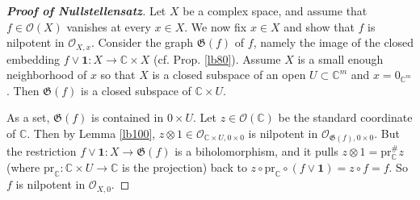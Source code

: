 \documentclass[12pt,b5paper,notitlepage]{report}
\theoremstyle{definition}
\theoremstyle{plain}
\newcommand{\fk}{\mathfrak}
\newcommand{\id}{\mathbf{1}}
\newcommand{\scr}{\mathscr}
\newcommand{\Cbb}{\mathbb C}
\newcommand{\pr}{\mathrm {pr}}
\numberwithin{equation}{section}
\begin{document}
\begin{proof}[\textbf{Proof of Nullstellensatz}]
Let $X$ be a complex space, and assume that $f\in\scr O(X)$ vanishes at every $x\in X$. We now fix $x\in X$ and show that $f$ is nilpotent in $\scr O_{X,x}$. Consider the graph $\fk G(f)$ of $f$, namely the image of the closed embedding $f\vee \id:X\rightarrow \Cbb\times X$ (cf. Prop. \ref{lb80}). Assume $X$ is a small enough neighborhood of $x$ so that $X$ is a closed subspace of an open $U\subset\Cbb^m$ and $x=0_{\Cbb^m}$. Then $\fk G(f)$ is a closed subspace of $\Cbb\times U$. 

As a set, $\fk G(f)$ is contained in $0\times U$. Let $z\in\scr O(\Cbb)$ be the standard coordinate of $\Cbb$. Then by Lemma \ref{lb100}, $z\otimes 1\in\scr O_{\Cbb\times U,0\times 0}$ is nilpotent in $\scr O_{\fk G(f),0\times 0}$. But the restriction $f\vee\id:X\rightarrow\fk G(f)$ is a biholomorphism, and it pulls $z\otimes 1=\pr_\Cbb^\# z$ (where $\pr_\Cbb:\Cbb\times U\rightarrow\Cbb$ is the projection) back to $z\circ \pr_\Cbb\circ(f\vee\id)=z\circ f=f$. So $f$ is nilpotent in $\scr O_{X,0}$.
\end{proof}
\end{document}
